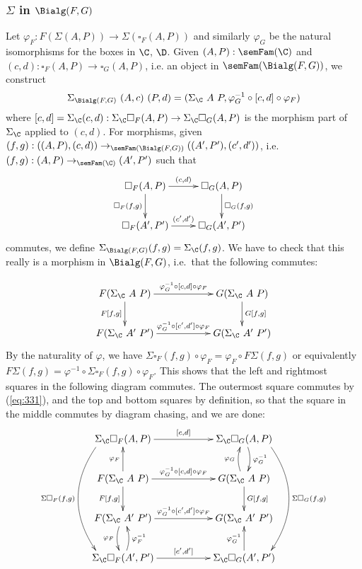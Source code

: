\documentclass{article}
\begin{document}
\subsubsection{$\Sigma$ in $\Bialg(F, G)$}

Let $\varphi_F : F (\Sigma(A, P)) \to \Sigma(\square_F(A, P))$ and
similarly $\varphi_G$ be the natural isomorphisms for the boxes in
$\C$, $\D$. Given $(A, P) : \semFam(\C)$ and $(c, d) : \square_F(A, P)
\to \square_G(A, P)$, i.e. an object in $\semFam(\Bialg(F, G))$, we
construct
\[
\Sigma_{\Bialg(F, G)}\ (A, c)\ (P, d) = (\Sigma_{\C}\ A\ P, \varphi^{-1}_G \circ [c, d] \circ \varphi_F)
\]
where $[c, d] = \Sigma_\C(c, d) : \Sigma_\C \square_F(A, P) \to
\Sigma_\C \square_G(A, P)$ is the morphism part of $\Sigma_\C$ applied
to $(c, d)$. For morphisms, given $(f, g) : ((A, P), (c, d))
\to_{\semFam(\Bialg(F, G))} ((A', P'), (c', d'))$, i.e.\ $(f, g) : (A,
P) \to_{\semFam(\C)} (A', P')$ such that
\begin{equation}
\label{eq:331}
\xymatrix{
\square_F(A, P) \ar^-{(c, d)}[r] \ar_-{\square_F(f, g)}[d] & \square_G(A, P) \ar^-{\square_G(f, g)}[d] \\
\square_F(A', P') \ar^-{(c', d')}[r] & \square_G(A', P') \\
}
\end{equation}
commutes, we define $\Sigma_{\Bialg(F, G)}(f, g) = \Sigma_{\C}(f, g)$.
We have to check that this really is a morphism in
$\Bialg(F, G)$, i.e.\ that the following commutes:

\[
\xymatrix{
F(\Sigma_{\C}\ A\ P) \ar^-{\varphi^{-1}_G \circ [c, d] \circ \varphi_F}[rr] \ar_-{F[f, g]}[d] & & G(\Sigma_{\C}\ A\ P) \ar^-{G[f,g]}[d] \\
F(\Sigma_{\C}\ A'\ P') \ar^-{\varphi^{-1}_G \circ [c', d'] \circ \varphi_F}[rr] & & G(\Sigma_{\C}\ A'\ P')
}
\]
By the naturality of $\varphi$, we have $\Sigma\square_F(f, g) \circ
\varphi_F = \varphi_F \circ F\Sigma(f, g)$ or equivalently $F\Sigma(f,
g) = \varphi^{-1} \circ \Sigma\square_F(f, g) \circ \varphi_F$. This
shows that the left and rightmost squares in the following diagram
commutes. The outermost square commutes by (\ref{eq:331}), and the top
and bottom squares by definition, so that the square in the middle
commutes by diagram chasing, and we are done:
\[
\xymatrix{
\Sigma_{\C}\square_F(A,P) \ar^-{[c, d]}[rr]  \ar_-{\Sigma\square_F(f, g)}@<-5ex>@/_2pc/[ddd] & & \Sigma_{\C}\square_G(A,P) \ar^-{\varphi^{-1}_G}@/^/[d] \ar^-{\Sigma\square_G(f, g)}@<5ex>@/^2pc/[ddd] \\
F(\Sigma_{\C}\ A\ P) \ar^-{\varphi_F}[u] \ar^-{\varphi^{-1}_G \circ [c, d] \circ \varphi_F}[rr] \ar_-{F[f, g]}[d] & & G(\Sigma_{\C}\ A\ P) \ar^-{G[f,g]}[d] \ar^-{\varphi_G}@/^/[u] \\
F(\Sigma_{\C}\ A'\ P') \ar_-{\varphi_F}@/_/[d] \ar^-{\varphi^{-1}_G \circ [c', d'] \circ \varphi_F}[rr] & & G(\Sigma_{\C}\ A'\ P') \\
\Sigma_{\C}\square_F(A',P') \ar_-{\varphi^{-1}_F}@/_/[u] \ar^-{[c', d']}[rr]  & & \Sigma_{\C}\square_G(A',P') \ar^-{\varphi^{-1}_G}[u] 
}
\]
\end{document}
